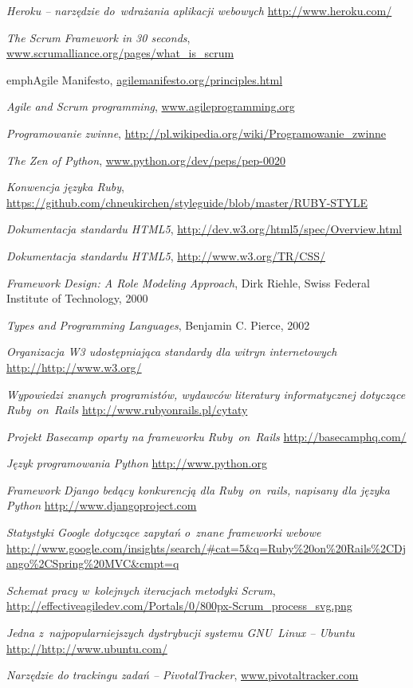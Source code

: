 \begin{thebibliography}{99}
   \emph{Heroku -- narzędzie do~wdrażania aplikacji webowych} \url{http://www.heroku.com/}

   \emph{The Scrum Framework in 30 seconds}, \url{www.scrumalliance.org/pages/what_is_scrum}

   emph{Agile Manifesto}, \url{agilemanifesto.org/principles.html}

   \emph{Agile and Scrum programming}, \url{www.agileprogramming.org}

   \emph{Programowanie zwinne}, \url{http://pl.wikipedia.org/wiki/Programowanie_zwinne}

   \emph{The Zen of Python}, \url{www.python.org/dev/peps/pep-0020}

   \emph{Konwencja języka Ruby}, \url{https://github.com/chneukirchen/styleguide/blob/master/RUBY-STYLE}

   \emph{Dokumentacja standardu HTML5}, \url{http://dev.w3.org/html5/spec/Overview.html}

   \emph{Dokumentacja standardu HTML5}, \url{http://www.w3.org/TR/CSS/}

   \emph{Framework Design: A Role Modeling Approach}, Dirk Riehle, Swiss Federal Institute of Technology, 2000

   \emph{Types and Programming Languages}, Benjamin C. Pierce, 2002

   \emph{Organizacja W3 udostępniająca standardy dla witryn internetowych} \url{http://http://www.w3.org/}

   \emph{Wypowiedzi znanych programistów, wydawców literatury informatycznej dotyczące Ruby~on~Rails} \url{http://www.rubyonrails.pl/cytaty}

   \emph{Projekt Basecamp oparty na frameworku Ruby~on~Rails} \url{http://basecamphq.com/}

   \emph{Język programowania Python} \url{http://www.python.org}

   \emph{Framework Django bedący konkurencją dla Ruby~on~rails, napisany dla języka Python} \url{http://www.djangoproject.com}

   \emph{Statystyki Google dotyczące zapytań o~znane frameworki webowe} \url{http://www.google.com/insights/search/\#cat=5\&q=Ruby\%20on\%20Rails\%2CDjango\%2CSpring\%20MVC\&cmpt=q}

   \emph{Schemat pracy w~kolejnych iteracjach metodyki Scrum}, \url{http://effectiveagiledev.com/Portals/0/800px-Scrum\_process\_svg.png}

   \emph{Jedna z~najpopularniejszych dystrybucji systemu GNU~Linux -- Ubuntu} \url{http://http://www.ubuntu.com/}

   \emph{Narzędzie do trackingu zadań -- PivotalTracker}, \url{www.pivotaltracker.com}

\end{thebibliography}

